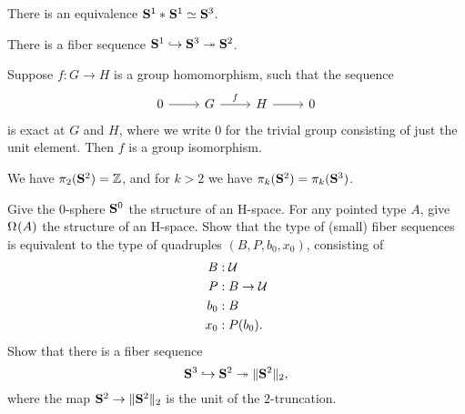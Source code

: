\begin{cor}
There is an equivalence $\eqv{\join{\sphere{1}}{\sphere{1}}}{\sphere{3}}$.
\end{cor}

\begin{thm}
There is a fiber sequence $\mathbf{S}^{1}\hookrightarrow\mathbf{S}^{3}\twoheadrightarrow\mathbf{S}^{2}$. 
\end{thm}

\begin{lem}
Suppose $f:G\to H$ is a group homomorphism, such that the sequence
\begin{equation*}
\begin{tikzcd}
0 \arrow[r] & G \arrow[r,"f"] & H \arrow[r] & 0
\end{tikzcd}
\end{equation*}
is exact at $G$ and $H$, where we write $0$ for the trivial group consisting of just the unit element. Then $f$ is a group isomorphism.
\end{lem}

\begin{cor}
We have $\pi_2(\mathbf{S}^{2})={\mathbb{Z}}$, and for $k>2$ we have $\pi_k(\mathbf{S}^{2})=\pi_k(\mathbf{S}^{3})$.
\end{cor}


\begin{exercises}
\exercise Give the $0$-sphere $\mathbf{S}^{0}$ the structure of an H-space.
\exercise For any pointed type $A$, give $\Omega^{}(A)$ the structure of an H-space.
\exercise Show that the type of (small) fiber sequences is equivalent to the type of quadruples $(B,P,b_0,x_0)$, consisting of
\begin{align*}
B & : \mathcal{U} \\
P & : B \to \mathcal{U} \\
b_0 & : B \\
x_0 & : P(b_0).
\end{align*}
\exercise Show that there is a fiber sequence
\begin{equation*}
  \mathbf{S}^{3}\hookrightarrow\mathbf{S}^{2}\twoheadrightarrow\Vert \mathbf{S}^{2}\Vert_{2},
\end{equation*}
where the map $\mathbf{S}^{2}\to\Vert \mathbf{S}^{2}\Vert_{2}$ is the unit of the $2$-truncation.
\end{exercises}
